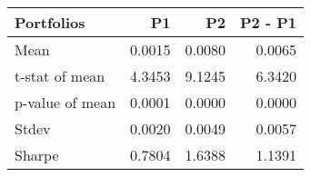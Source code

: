 \begin{tabular}{lrrr}
\toprule
Portfolios & P1 & P2 & P2 - P1 \\
\midrule
Mean & 0.0015 & 0.0080 & 0.0065 \\
t-stat of mean & 4.3453 & 9.1245 & 6.3420 \\
p-value of mean & 0.0001 & 0.0000 & 0.0000 \\
Stdev & 0.0020 & 0.0049 & 0.0057 \\
Sharpe & 0.7804 & 1.6388 & 1.1391 \\
\bottomrule
\end{tabular}
